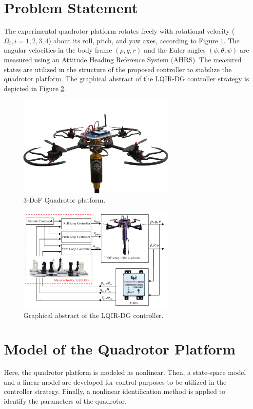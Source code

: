 \documentclass[3p]{elsarticle}
\begin{document}
\section{Problem Statement}\label{sec:problem}
\noindent The experimental quadrotor platform rotates freely with rotational velocity ($\Omega_i, i = 1, 2, 3, 4$) about its roll, pitch, and yaw axes, according to Figure \ref{fig:quadrotor}.
The angular velocities in the body frame $(p, q, r)$ and the Euler angles $(\phi, \theta, \psi)$ are measured using an Attitude Heading Reference System (AHRS).
The measured states are utilized in the structure of the proposed controller to stabilize the quadrotor platform.
The graphical abstract of the LQIR-DG controller strategy is depicted in Figure \ref{fig:blockdiagram}.
\begin{figure}[H]
    \centering
    \includegraphics[width=0.7\textwidth]{../Figure/3DOFQuad.png}
    \caption{3-DoF Quadrotor platform.}
    \label{fig:quadrotor}
 \end{figure}
 
 \begin{figure}[H]
    \centering
    \includegraphics[width=0.7\textwidth]{../Figure/schematic.pdf}
    \caption{Graphical abstract of the LQIR-DG controller.}
    \label{fig:blockdiagram}
 \end{figure}
 \section{Model of the Quadrotor Platform}\label{sec:modeling}
 \noindent Here, the quadrotor platform is modeled as nonlinear.
 Then, a state-space model and a linear model are developed for control purposes to be utilized in the controller strategy.
 Finally, a nonlinear identification method is applied to identify the parameters of the quadrotor.
\end{document}
